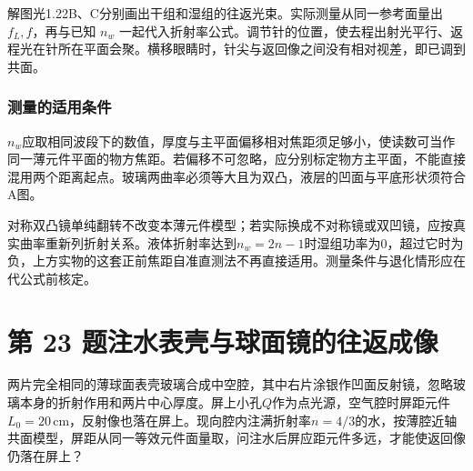 \documentclass[UTF8,fontset=fandol,a4paper,11pt]{ctexart}
\begin{document}
解图光1.22B、C分别画出干组和湿组的往返光束。实际测量从同一参考面量出 $f_L,f$，再与已知 $n_w$ 一起代入折射率公式。调节针的位置，使去程出射光平行、返程光在针所在平面会聚。横移眼睛时，针尖与返回像之间没有相对视差，即已调到共面。

\subsubsection*{测量的适用条件}
$n_w$应取相同波段下的数值，厚度与主平面偏移相对焦距须足够小，使读数可当作同一薄元件平面的物方焦距。若偏移不可忽略，应分别标定物方主平面，不能直接混用两个距离起点。玻璃两曲率必须等大且为双凸，液层的凹面与平底形状须符合A图。

对称双凸镜单纯翻转不改变本薄元件模型；若实际换成不对称镜或双凹镜，应按真实曲率重新列折射关系。液体折射率达到$n_w=2n-1$时湿组功率为0，超过它时为负，上方实物的这套正前焦距自准直测法不再直接适用。测量条件与退化情形应在代公式前核定。




\section*{第 23 题\quad 注水表壳与球面镜的往返成像}\label{q:23}

两片完全相同的薄球面表壳玻璃合成中空腔，其中右片涂银作凹面反射镜，忽略玻璃本身的折射作用和两片中心厚度。屏上小孔$Q$作为点光源，空气腔时屏距元件$L_0=20\,\mathrm{cm}$，反射像也落在屏上。现向腔内注满折射率$n=4/3$的水，按薄腔近轴共面模型，屏距从同一等效元件面量取，问注水后屏应距元件多远，才能使返回像仍落在屏上？
\end{document}

